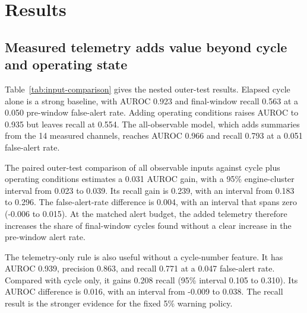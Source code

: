 \section{Results}
\label{sec:results}

\subsection{Measured telemetry adds value beyond cycle and operating state}

Table~\ref{tab:input-comparison} gives the nested outer-test results. Elapsed
cycle alone is a strong baseline, with AUROC 0.923 and final-window recall
0.563 at a 0.050 pre-window false-alert rate. Adding operating conditions
raises AUROC to 0.935 but leaves recall at 0.554. The all-observable model,
which adds summaries from the 14 measured channels, reaches AUROC 0.966 and
recall 0.793 at a 0.051 false-alert rate.

The paired outer-test comparison of all observable inputs against cycle plus
operating conditions estimates a 0.031 AUROC gain, with a 95\% engine-cluster
interval from 0.023 to 0.039. Its recall gain is 0.239, with an interval from
0.183 to 0.296. The false-alert-rate difference is 0.004, with an interval
that spans zero (-0.006 to 0.015). At the matched alert budget, the added
telemetry therefore increases the share of final-window cycles found without a
clear increase in the pre-window alert rate.

The telemetry-only rule is also useful without a cycle-number feature. It has
AUROC 0.939, precision 0.863, and recall 0.771 at a 0.047 false-alert rate.
Compared with cycle only, it gains 0.208 recall (95\% interval 0.105 to 0.310).
Its AUROC difference is 0.016, with an interval from -0.009 to 0.038. The
recall result is the stronger evidence for the fixed 5\% warning policy.

\begin{table}[H]
\centering
\caption{Nested engine-held-out performance at a target 5\% pre-window
false-alert budget. Values in brackets are 95\% percentile intervals from
2,000 complete-engine bootstrap resamples.}
\label{tab:input-comparison}
\scriptsize
{}
\end{table}


